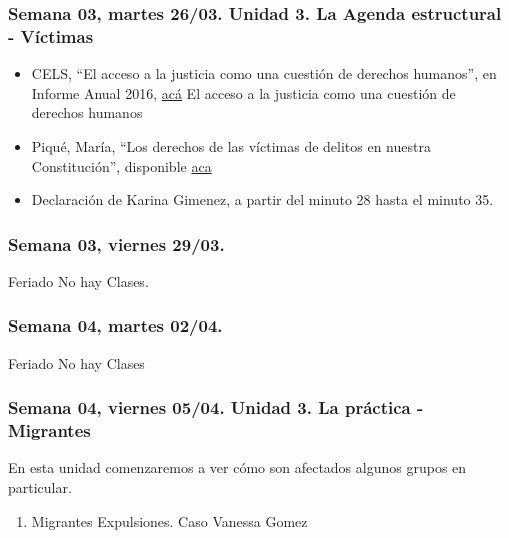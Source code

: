 \documentclass[
]{article}
\providecommand{\tightlist}{%
  \setlength{\itemsep}{0pt}\setlength{\parskip}{0pt}}
\begin{document}
\hypertarget{semana-03-martes-2603.-unidad-3.-la-agenda-estructural---vuxedctimas}{%
\subsubsection{Semana 03, martes 26/03. Unidad 3. La Agenda estructural
-
Víctimas}\label{semana-03-martes-2603.-unidad-3.-la-agenda-estructural---vuxedctimas}}

\begin{itemize}
\item
  CELS, ``El acceso a la justicia como una cuestión de derechos
  humanos'', en Informe Anual 2016,
  \href{https://drive.google.com/file/d/1qH6DsnHctmesy6nje2f5NgCyowQ0PkyM/view?usp=sharing}{acá}
  El acceso a la justicia como una cuestión de derechos humanos
\item
  Piqué, María, ``Los derechos de las víctimas de delitos en nuestra
  Constitución'', disponible
  \href{https://drive.google.com/file/d/1NaUqgIjcAosZx6OCPuJzcdG3sbKrqfaC/view?usp=sharing}{aca}
\item
  Declaración de Karina Gimenez, a partir del minuto 28 hasta el minuto
  35.
\end{itemize}

\hypertarget{semana-03-viernes-2903.}{%
\subsubsection{Semana 03, viernes
29/03.}\label{semana-03-viernes-2903.}}

Feriado No hay Clases.

\hypertarget{semana-04-martes-0204.}{%
\subsubsection{Semana 04, martes 02/04.}\label{semana-04-martes-0204.}}

Feriado No hay Clases

\hypertarget{semana-04-viernes-0504.-unidad-3.-la-pruxe1ctica---migrantes}{%
\subsubsection{Semana 04, viernes 05/04. Unidad 3. La práctica -
Migrantes}\label{semana-04-viernes-0504.-unidad-3.-la-pruxe1ctica---migrantes}}

En esta unidad comenzaremos a ver cómo son afectados algunos grupos en
particular.

\begin{enumerate}
\def\labelenumi{\alph{enumi}.}
\tightlist
\item
  Migrantes Expulsiones. Caso Vanessa Gomez
\end{enumerate}
\end{document}

